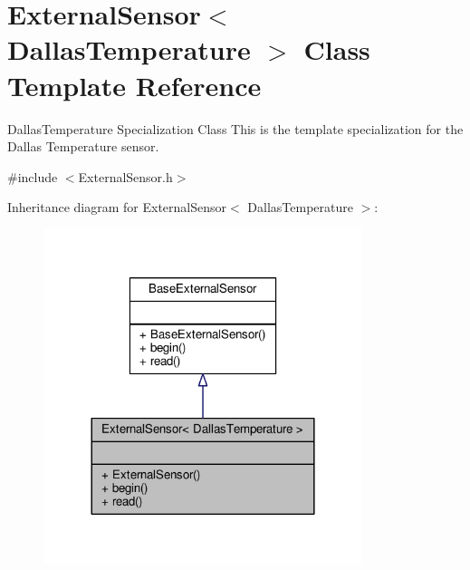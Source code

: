 \hypertarget{class_external_sensor_3_01_dallas_temperature_01_4}{}\section{External\+Sensor$<$ Dallas\+Temperature $>$ Class Template Reference}
\label{class_external_sensor_3_01_dallas_temperature_01_4}


Dallas\+Temperature Specialization Class This is the template specialization for the Dallas Temperature sensor.  




{\ttfamily \#include $<$External\+Sensor.\+h$>$}



Inheritance diagram for External\+Sensor$<$ Dallas\+Temperature $>$\+:
\nopagebreak
\begin{figure}[H]
\begin{center}
\leavevmode
\includegraphics[width=264pt]{d4/d74/class_external_sensor_3_01_dallas_temperature_01_4__inherit__graph}
\end{center}
\end{figure}



